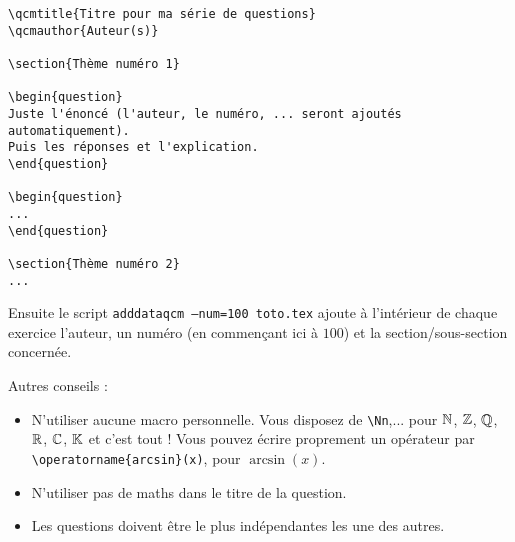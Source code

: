 \documentclass[12pt,a4paper]{article}
\begin{document}
\begin{center}
\begin{minipage}{0.8\textwidth}
\begin{verbatim}
\qcmtitle{Titre pour ma série de questions}
\qcmauthor{Auteur(s)}

\section{Thème numéro 1}

\begin{question}
Juste l'énoncé (l'auteur, le numéro, ... seront ajoutés automatiquement).
Puis les réponses et l'explication.
\end{question}

\begin{question}
...
\end{question}

\section{Thème numéro 2}
...

\end{verbatim}
\end{minipage}
\end{center}

Ensuite le script \texttt{adddataqcm --num=100 toto.tex} ajoute à l'intérieur de chaque exercice l'auteur, un numéro (en commençant ici à $100$) et la section/sous-section concernée.


\bigskip


Autres conseils :
\begin{itemize}
  \item N'utiliser aucune macro personnelle. Vous disposez de \verb|\Nn|,... pour $\mathbb{N}$, $\mathbb{Z}$, $\mathbb{Q}$, $\mathbb{R}$, $\mathbb{C}$, $\mathbb{K}$ et c'est tout ! Vous pouvez écrire proprement un opérateur par \verb|\operatorname{arcsin}(x)|, pour $\operatorname{arcsin}(x)$.
  
  \item N'utiliser pas de maths dans le titre de la question.
  
  \item Les questions doivent être le plus indépendantes les une des autres.

  
\end{itemize}
\end{document}
